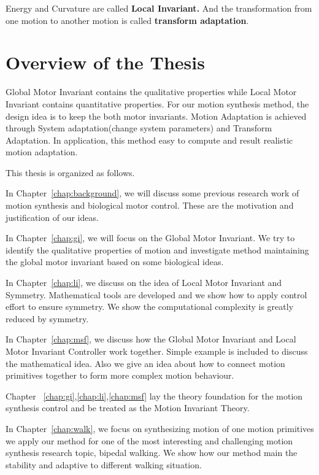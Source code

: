 Energy and Curvature are called \textbf{Local Invariant.} 
And the transformation from one motion to another motion is called \textbf{transform adaptation}.



\section{Overview of the Thesis}
Global Motor Invariant contains the qualitative properties while Local Motor Invariant contains quantitative properties. 
For our motion synthesis method, the design idea is to keep the both motor invariants. 
Motion Adaptation is achieved through System adaptation(change system parameters) and Transform Adaptation.
In application, this method easy to compute and result realistic motion adaptation.



This thesis is organized as follows.
 
In Chapter~\ref{chap:background}, we will discuss some previous research work of motion synthesis  and biological motor control. 
These are the motivation and justification of our ideas.
 
In Chapter~\ref{chap:gi}, we will focus on the Global Motor Invariant. 
We try to identify the qualitative properties of motion and investigate method maintaining the global motor invariant based on some biological ideas.

In Chapter~\ref{chap:li}, we discuss on the idea of Local Motor Invariant and Symmetry.
Mathematical tools are developed and we show how to apply control effort to ensure symmetry. 
We show the computational complexity is greatly reduced by symmetry.

In Chapter~\ref{chap:msf}, we discuss how the Global Motor Invariant and Local Motor Invariant Controller work together. 
Simple example is included to discuss the mathematical idea. 
Also we give an idea about how to connect motion primitives together to form more complex motion behaviour.

Chapter ~\ref{chap:gi},\ref{chap:li},\ref{chap:msf} lay the theory foundation for the motion synthesis control and be treated as the Motion Invariant Theory.


In Chapter~\ref{chap:walk}, we focus on synthesizing motion of one motion primitives
 we apply our method for one of the most interesting and challenging motion synthesis research topic, bipedal walking. We show how our method main the stability and adaptive to different walking situation.


